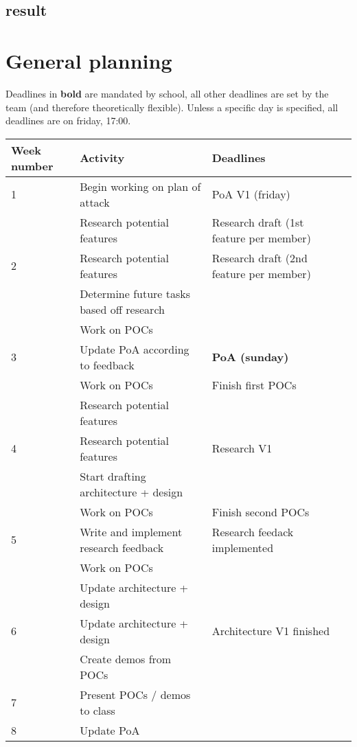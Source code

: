\documentclass{article} %
\begin{document}
    \subsection{result}
    \newpage

    \section{General planning} %
    Deadlines in \textbf{bold} are mandated by school, all other deadlines are set by the team (and therefore theoretically flexible).
    Unless a specific day is specified, all deadlines are on friday, 17:00.
    \begin{tabularx}{\textwidth}{|X|X|X|X|}
    \hline
    \textbf{Week number} & \textbf{Activity} & \textbf{Deadlines} \\ \hline
    1 & Begin working on plan of attack & PoA V1 (friday) \\ \hline
      & Research potential features & Research draft (1st feature per member) \\ \hline
    2 & Research potential features & Research draft (2nd feature per member) \\ \hline
      & Determine future tasks based off research &  \\ \hline
      & Work on POCs & \\ \hline
    3 & Update PoA according to feedback &  \textbf{PoA (sunday)} \\ \hline
      & Work on POCs & Finish first POCs \\ \hline
      & Research potential features & \\ \hline
    4 & Research potential features & Research V1 \\ \hline
      & Start drafting architecture + design &  \\ \hline
      & Work on POCs & Finish second POCs \\ \hline
    5 & Write and implement research feedback & Research feedack implemented \\ \hline
     & Work on POCs &  \\ \hline
      & Update architecture + design &  \\ \hline
    6 & Update architecture + design & Architecture V1 finished \\ \hline
      & Create demos from POCs & \\ \hline
    7 & Present POCs / demos to class &  \\ \hline
    8 & Update PoA &  \\ \hline

\end{tabularx}
\end{document}
